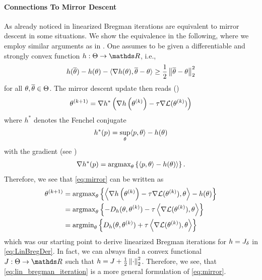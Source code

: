 \paragraph{Connections To Mirror Descent}
As already noticed in \cite{villa2023implicit} linearized Bregman iterations are equivalent to mirror descent in some situations. We show the equivalence in the following, where we employ similar arguments as in \cite{beck2003mirror}.
%
One assumes to be given a differentiable and strongly convex function $h:\Param\to\R$, i.e.,
%
\begin{align*}
h(\overline{\theta}) - h(\theta) - \langle\nabla h(\theta), \overline{\theta} - \theta \rangle \geq  
\frac{1}{2} \left\|\overline{\theta} - \theta\right\|^2_2
\end{align*}
%
for all $\theta,\overline{\theta}\in\Theta$. The mirror descent update then reads (\cite{nemirovskij1983problem, beck2003mirror})
%
\begin{align}\label{eq:mirror}
\theta^{(k+1)} = \nabla h^\ast\left(\nabla h\left(\theta^{(k)}\right) - \tau \nabla\mathcal{L}(\theta^{(k)})\right)
\end{align}
%
where $h^\ast$ denotes the Fenchel conjugate
%
\begin{align*}
h^\ast(p) = \sup_{\theta} \langle p, \theta\rangle - h(\theta)
\end{align*}
%
with the gradient (see \cite{boyd2004convex})
%
\begin{align*}
\nabla h^\ast(p) = \operatorname{argmax}_{\theta} \left\{ \langle p, \theta\rangle - h(\theta)\rangle\right\}.
\end{align*}
%
Therefore, we see that \cref{eq:mirror} can be written as
%
\begin{align*}
\theta^{(k+1)} &= \operatorname{argmax}_\theta
\left\{\left\langle\nabla h\left(\theta^{(k)}\right) - \tau \nabla\mathcal{L}(\theta^{(k)}), \theta \right\rangle - h(\theta)\right\}\\
&=
\operatorname{argmax}_\theta \left\{-D_h(\theta, \theta^{(k)})-\tau\left\langle \nabla\mathcal{L}(\theta^{(k)}), \theta \right\rangle\right\}\\
&=
\operatorname{argmin}_\theta \left\{D_h(\theta, \theta^{(k)})+\tau\left\langle \nabla\mathcal{L}(\theta^{(k)}), \theta \right\rangle\right\}
\end{align*}
%
which was our starting point to derive linearized Bregman iterations for $h=J_{\delta}$ in \cref{eq:LinBregDer}. In fact, we can always find a convex functional $\func:\Theta\to\R$ such that $h = J + \frac{1}{2}\left\|\cdot\right\|_2^2$. Therefore, we see, that \cref{eq:lin_bregman_iteration} is a more general formulation of \cref{eq:mirror}.
%
%

